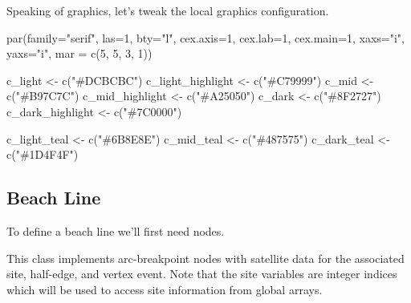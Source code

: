 \documentclass[
  letterpaper,
  DIV=11,
  numbers=noendperiod]{scrartcl}
\newenvironment{Shaded}{\begin{snugshade}}{\end{snugshade}}
\newcommand{\AttributeTok}[1]{\textcolor[rgb]{0.40,0.45,0.13}{#1}}
\newcommand{\DecValTok}[1]{\textcolor[rgb]{0.68,0.00,0.00}{#1}}
\newcommand{\FunctionTok}[1]{\textcolor[rgb]{0.28,0.35,0.67}{#1}}
\newcommand{\NormalTok}[1]{\textcolor[rgb]{0.00,0.23,0.31}{#1}}
\newcommand{\OtherTok}[1]{\textcolor[rgb]{0.00,0.23,0.31}{#1}}
\newcommand{\StringTok}[1]{\textcolor[rgb]{0.13,0.47,0.30}{#1}}
\begin{document}
Speaking of graphics, let's tweak the local graphics configuration.

\begin{Shaded}
\begin{Highlighting}[]
\FunctionTok{par}\NormalTok{(}\AttributeTok{family=}\StringTok{"serif"}\NormalTok{, }\AttributeTok{las=}\DecValTok{1}\NormalTok{, }\AttributeTok{bty=}\StringTok{"l"}\NormalTok{,}
    \AttributeTok{cex.axis=}\DecValTok{1}\NormalTok{, }\AttributeTok{cex.lab=}\DecValTok{1}\NormalTok{, }\AttributeTok{cex.main=}\DecValTok{1}\NormalTok{,}
    \AttributeTok{xaxs=}\StringTok{"i"}\NormalTok{, }\AttributeTok{yaxs=}\StringTok{"i"}\NormalTok{, }\AttributeTok{mar =} \FunctionTok{c}\NormalTok{(}\DecValTok{5}\NormalTok{, }\DecValTok{5}\NormalTok{, }\DecValTok{3}\NormalTok{, }\DecValTok{1}\NormalTok{))}

\NormalTok{c\_light }\OtherTok{\textless{}{-}} \FunctionTok{c}\NormalTok{(}\StringTok{"\#DCBCBC"}\NormalTok{)}
\NormalTok{c\_light\_highlight }\OtherTok{\textless{}{-}} \FunctionTok{c}\NormalTok{(}\StringTok{"\#C79999"}\NormalTok{)}
\NormalTok{c\_mid }\OtherTok{\textless{}{-}} \FunctionTok{c}\NormalTok{(}\StringTok{"\#B97C7C"}\NormalTok{)}
\NormalTok{c\_mid\_highlight }\OtherTok{\textless{}{-}} \FunctionTok{c}\NormalTok{(}\StringTok{"\#A25050"}\NormalTok{)}
\NormalTok{c\_dark }\OtherTok{\textless{}{-}} \FunctionTok{c}\NormalTok{(}\StringTok{"\#8F2727"}\NormalTok{)}
\NormalTok{c\_dark\_highlight }\OtherTok{\textless{}{-}} \FunctionTok{c}\NormalTok{(}\StringTok{"\#7C0000"}\NormalTok{)}

\NormalTok{c\_light\_teal }\OtherTok{\textless{}{-}} \FunctionTok{c}\NormalTok{(}\StringTok{"\#6B8E8E"}\NormalTok{)}
\NormalTok{c\_mid\_teal }\OtherTok{\textless{}{-}} \FunctionTok{c}\NormalTok{(}\StringTok{"\#487575"}\NormalTok{)}
\NormalTok{c\_dark\_teal }\OtherTok{\textless{}{-}} \FunctionTok{c}\NormalTok{(}\StringTok{"\#1D4F4F"}\NormalTok{)}
\end{Highlighting}
\end{Shaded}

\subsection{Beach Line}\label{beach-line}

To define a beach line we'll first need nodes.

This class implements arc-breakpoint nodes with satellite data for the
associated site, half-edge, and vertex event. Note that the site
variables are integer indices which will be used to access site
information from global arrays.
\end{document}
